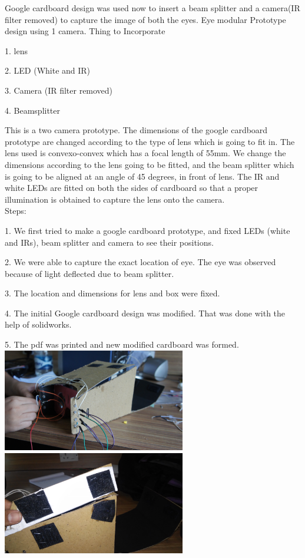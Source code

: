 \documentclass[12pt]{article}
\begin{document}
Google cardboard design was used now to insert a beam splitter and a camera(IR filter removed) to capture the image of both the eyes. 
Eye modular Prototype design using 1 camera.
Thing to Incorporate 

  1. lens 

  2. LED (White and IR)
	
  3. Camera (IR filter removed)

  4. Beamsplitter 

This is a two camera prototype. The dimensions of the google cardboard prototype are changed according to the type of lens which is going to fit in. The lens used is convexo-convex which has a focal length of 55mm. We change the dimensions according to the lens going to be fitted, and the beam splitter which is going to be aligned at an angle of 45 degrees, in front of lens. The IR and white LEDs are fitted on both the sides of cardboard so that a proper illumination is obtained to capture the lens onto the camera. \\
Steps:

1. We first tried to make a google cardboard prototype, and fixed LEDs (white and IRs), beam splitter and camera to see their positions. 

2. We were able to capture the exact location of eye. The eye was observed because of light deflected due to beam splitter.

3. The location and dimensions for lens and box were fixed.

4. The initial Google cardboard design was modified. That was done with the help of solidworks. 

5. The pdf was printed and new modified cardboard was formed. \\


\includegraphics[width=8cm]{DSC03895} 
\includegraphics[width=8cm]{20141225_162318} 
\end{document}
